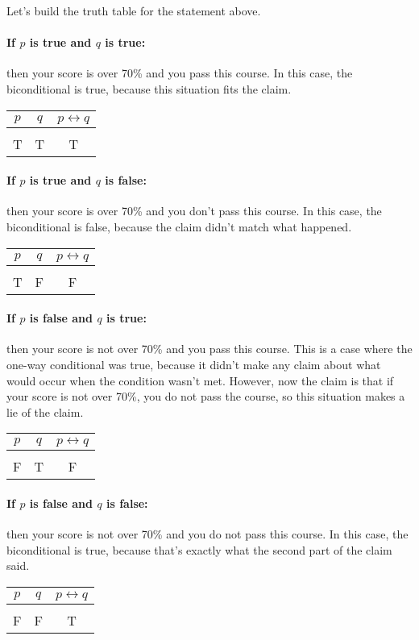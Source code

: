 Let's build the truth table for the statement above.

\paragraph{If $p$ is true and $q$ is true:} then your score is over 70\% and you pass this course.  In this case, the biconditional is true, because this situation fits the claim.
\begin{center}
\begin{tabular}{c c c}
$p$ & $q$ & $p \leftrightarrow q$\\
\hline
& & \\
T & T & T
\end{tabular}
\end{center}

\paragraph{If $p$ is true and $q$ is false:} then your score is over 70\% and you don't pass this course.  In this case, the biconditional is false, because the claim didn't match what happened.
\begin{center}
\begin{tabular}{c c c}
$p$ & $q$ & $p \leftrightarrow q$\\
\hline
& & \\
T & F & F
\end{tabular}
\end{center}

\paragraph{If $p$ is false and $q$ is true:} then your score is not over 70\% and you pass this course.  This is a case where the one-way conditional was true, because it didn't make any claim about what would occur when the condition wasn't met.  However, now the claim is that if your score is not over 70\%, you do not pass the course, so this situation makes a lie of the claim.
\begin{center}
\begin{tabular}{c c c}
$p$ & $q$ & $p \leftrightarrow q$\\
\hline
& & \\
F & T & F
\end{tabular}
\end{center}

\paragraph{If $p$ is false and $q$ is false:} then your score is not over 70\% and you do not pass this course.  In this case, the biconditional is true, because that's exactly what the second part of the claim said.
\begin{center}
\begin{tabular}{c c c}
$p$ & $q$ & $p \leftrightarrow q$\\
\hline
& & \\
F & F & T
\end{tabular}
\end{center}

